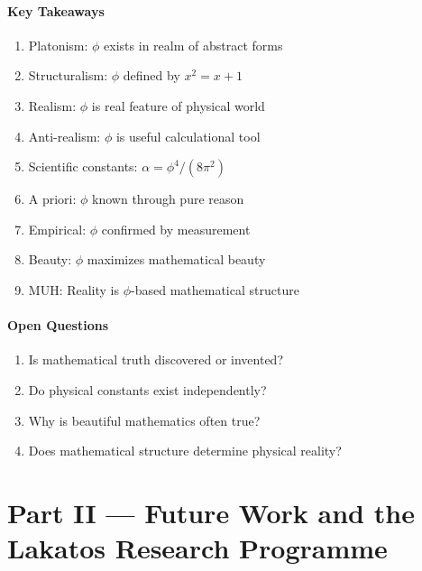 \subsection*{Key Takeaways}

\begin{enumerate}
    \item Platonism: $\phi$ exists in realm of abstract forms
    \item Structuralism: $\phi$ defined by $x^2 = x + 1$
    \item Realism: $\phi$ is real feature of physical world
    \item Anti-realism: $\phi$ is useful calculational tool
    \item Scientific constants: $\alpha = \phi^4/(8\pi^2)$
    \item A priori: $\phi$ known through pure reason
    \item Empirical: $\phi$ confirmed by measurement
    \item Beauty: $\phi$ maximizes mathematical beauty
    \item MUH: Reality is $\phi$-based mathematical structure
\end{enumerate}

\subsection*{Open Questions}

\begin{enumerate}
    \item Is mathematical truth discovered or invented?
    \item Do physical constants exist independently?
    \item Why is beautiful mathematics often true?
    \item Does mathematical structure determine physical reality?
\end{enumerate}


\part*{Part II — Future Work and the Lakatos Research Programme}

